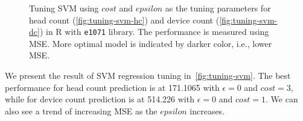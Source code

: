 	\begin{figure}[h]
		\begin{adjustwidth}{-1cm}{}
		\centering
		\end{adjustwidth}
		\caption{Tuning \ac{SVM} using $cost$ and $epsilon$ as the tuning parameters for head count (\ref{fig:tuning-svm-hc}) and device count (\ref{fig:tuning-svm-dc}) in R with \texttt{e1071} library. The performance is measured using \ac{MSE}. More optimal model is indicated by darker color, i.e., lower \ac{MSE}.}
		\label{fig:tuning-svm}
	\end{figure}

	We present the result of \ac{SVM} regression tuning in~\autoref{fig:tuning-svm}. The best performance for head count prediction is at 171.1065 with $\epsilon=0$ and $cost=3$, while for device count prediction is at 514.226 with $\epsilon=0$ and $cost=1$. We can also see a trend of increasing \ac{MSE} as the $epsilon$ increases.


